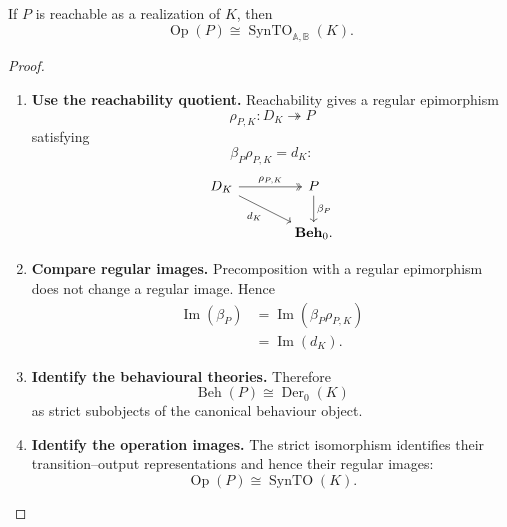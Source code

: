\begin{corollary}
\label{cor:to-reachable-operation-image}
    If \(P\) is reachable as a realization of \(K\), then
    \[
        \operatorname{Op}(P)
        \cong
        \operatorname{SynTO}_{\mathbb A,\mathbb B}(K).
    \]
\end{corollary}

\begin{proof}
    \leavevmode
    \begin{enumerate}
        \item \textbf{Use the reachability quotient.}
        Reachability gives a regular epimorphism
        \[
            \rho_{P,K}:D_K\twoheadrightarrow P
        \]
        satisfying
        \[
            \beta_P\rho_{P,K}=d_K:
        \]
        \[
        \begin{tikzcd}[column sep=large]
            D_K
                \arrow[r, two heads, "\rho_{P,K}"]
                \arrow[dr, "d_K"']
            &
            P
                \arrow[d, "\beta_P"]
            \\
            &
            \mathbf{Beh}_0.
        \end{tikzcd}
        \]

        \item \textbf{Compare regular images.}
        Precomposition with a regular epimorphism does not change a regular
        image. Hence
        \[
        \begin{aligned}
            \operatorname{Im}(\beta_P)
            &=
            \operatorname{Im}(\beta_P\rho_{P,K})
            \\
            &=
            \operatorname{Im}(d_K).
        \end{aligned}
        \]

        \item \textbf{Identify the behavioural theories.}
        Therefore
        \[
            \operatorname{Beh}(P)
            \cong
            \operatorname{Der}_0(K)
        \]
        as strict subobjects of the canonical behaviour object.

        \item \textbf{Identify the operation images.}
        The strict isomorphism identifies their transition--output
        representations and hence their regular images:
        \[
            \operatorname{Op}(P)
            \cong
            \operatorname{SynTO}(K).
        \]
    \end{enumerate}
\end{proof}

